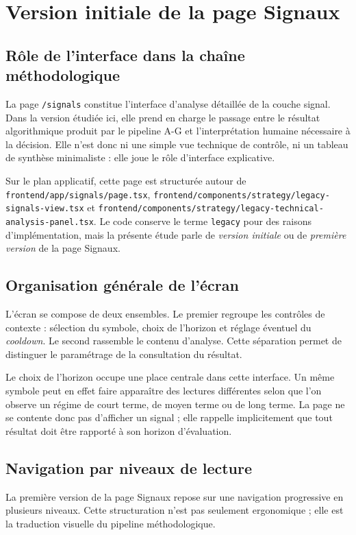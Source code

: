 \chapter{Version initiale de la page Signaux}

\section{Rôle de l'interface dans la chaîne méthodologique}
La page \texttt{/signals} constitue l'interface d'analyse détaillée de la couche
signal. Dans la version étudiée ici, elle prend en charge le passage entre le
résultat algorithmique produit par le pipeline A-G et l'interprétation humaine
nécessaire à la décision. Elle n'est donc ni une simple vue technique de
contrôle, ni un tableau de synthèse minimaliste : elle joue le rôle d'interface
explicative.

Sur le plan applicatif, cette page est structurée autour de
\texttt{frontend/app/signals/page.tsx},
\texttt{frontend/components/strategy/legacy-signals-view.tsx} et
\texttt{frontend/components/strategy/legacy-technical-analysis-panel.tsx}. Le
code conserve le terme \texttt{legacy} pour des raisons d'implémentation, mais la
présente étude parle de \emph{version initiale} ou de \emph{première version}
de la page Signaux.

\section{Organisation générale de l'écran}
L'écran se compose de deux ensembles. Le premier regroupe les contrôles de
contexte : sélection du symbole, choix de l'horizon et réglage éventuel du
\emph{cooldown}. Le second rassemble le contenu d'analyse. Cette séparation
permet de distinguer le paramétrage de la consultation du résultat.

Le choix de l'horizon occupe une place centrale dans cette interface. Un même
symbole peut en effet faire apparaître des lectures différentes selon que l'on
observe un régime de court terme, de moyen terme ou de long terme. La page ne se
contente donc pas d'afficher un signal ; elle rappelle implicitement que tout
résultat doit être rapporté à son horizon d'évaluation.

\section{Navigation par niveaux de lecture}
La première version de la page Signaux repose sur une navigation progressive en
plusieurs niveaux. Cette structuration n'est pas seulement ergonomique ; elle est
la traduction visuelle du pipeline méthodologique.

